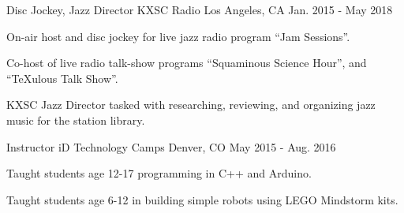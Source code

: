 \begin{cventries}
  \cventry
    {Disc Jockey, Jazz Director} %
    {KXSC Radio} %
    {Los Angeles, CA} %
    {Jan. 2015 - May 2018} %
    {
      \begin{cvitems} %
        \item {On-air host and disc jockey for live jazz radio program ``Jam Sessions''.}
        \item {Co-host of live radio talk-show programs ``Squaminous Science Hour'', and ``TeXulous Talk Show''.}
        \item {KXSC Jazz Director tasked with researching, reviewing, and organizing jazz music for the station library.}
      \end{cvitems}
    }
  \cventry
    {Instructor} %
    {iD Technology Camps} %
    {Denver, CO} %
    {May 2015 - Aug. 2016} %
    {
      \begin{cvitems} %
        \item {Taught students age 12-17 programming in C++ and Arduino.}
        \item {Taught students age 6-12 in building simple robots using LEGO Mindstorm kits.}
      \end{cvitems}
    }

\end{cventries}
